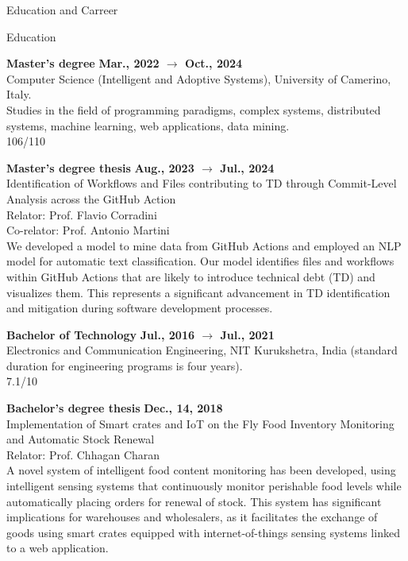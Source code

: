 \documentclass{resume} %
\begin{document}
\begin{rSection}{Education and Carreer}
\begin{rSubsection2}{Education}
            \item\textbf{ Master's degree }\hfill \textbf{Mar., 2022 $\rightarrow$ Oct., 2024}
            \\Computer Science (Intelligent and Adoptive Systems), University of Camerino, Italy.
            \\Studies in the field of programming paradigms, complex systems, distributed systems, machine learning, web applications, data mining.
            \\106/110
            \item\textbf{ Master's degree thesis }\hfill \textbf{Aug., 2023 $\rightarrow$ Jul., 2024}
            \\Identification of Workflows and Files contributing to TD through Commit-Level Analysis across the GitHub Action
            \\Relator: Prof. Flavio Corradini
            \\Co-relator: Prof. Antonio Martini
            \\We developed a model to mine data from GitHub Actions and employed an NLP model for automatic text classification.
            Our model identifies files and workflows within GitHub Actions that are likely to introduce technical debt (TD) and visualizes them.
            This represents a significant advancement in TD identification and mitigation during software development processes.
            \item\textbf{ Bachelor of Technology }\hfill \textbf{Jul., 2016 $\rightarrow$ Jul., 2021}
            \\Electronics and Communication Engineering, NIT Kurukshetra, India (standard duration for engineering programs is four years).
            \\7.1/10
            \item\textbf{ Bachelor's degree thesis }\hfill \textbf{Dec., 14, 2018}
            \\Implementation of Smart crates and IoT on the Fly Food Inventory Monitoring and Automatic Stock Renewal
            \\Relator: Prof. Chhagan Charan
            \\A novel system of intelligent food content monitoring has been developed, using intelligent sensing systems that continuously monitor perishable food levels while automatically placing orders for renewal of stock.
            This system has significant implications for warehouses and wholesalers, as it facilitates the exchange of goods using smart crates equipped with internet-of-things sensing systems linked to a web application.
        \end{rSubsection2}


\end{rSection}
\end{document}
